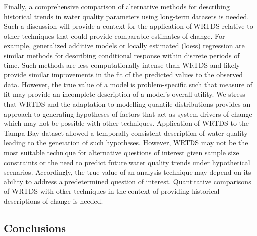 \documentclass{svjour3}\usepackage[]{graphicx}\usepackage[]{color}
\begin{document}
Finally, a comprehensive comparison of alternative methods for describing historical trends in water quality parameters using long-term datasets is needed.  Such a discussion will provide a context for the application of \ac{WRTDS} relative to other techniques that could provide comparable estimates of change.  For example, generalized additive models or locally estimated (loess) regression are similar methods for describing conditional response within discrete periods of time.  Such methods are less computationally intense than \ac{WRTDS} and likely provide similar improvements in the fit of the predicted values to the observed data. However, the true value of a model is problem-specific such that measure of fit may provide an incomplete description of a model's overall utility.  We stress that \ac{WRTDS} and the adaptation to modelling quantile distributions provides an approach to generating hypotheses of factors that act as system drivers of change which may not be possible with other techniques.  Application of \ac{WRTDS} to the Tampa Bay dataset allowed a temporally consistent description of water quality leading to the generation of such hypotheses.  However, \ac{WRTDS} may not be the most suitable technique for alternative questions of interest given sample size constraints or the need to predict future water quality trends under hypothetical scenarios.  Accordingly, the true value of an analysis technique may depend on its ability to address a predetermined question of interest.  Quantitative comparisons of \ac{WRTDS} with other techniques in the context of providing historical descriptions of change is needed.

\subsection{Conclusions}
\end{document}
